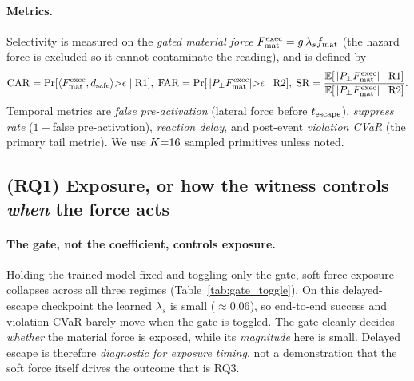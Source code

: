 \paragraph{Metrics.} Selectivity is measured on the \emph{gated material force} $F_{\rm mat}^{\rm exec}=g\,\lambda_s f_{\rm mat}$ (the hazard force is excluded so it cannot contaminate the reading), and is defined by
\begin{equation}
\mathrm{CAR}=\Pr[\langle F_{\rm mat}^{\rm exec},d_{\rm safe}\rangle{>}\epsilon\mid \mathrm{R1}],\;
\mathrm{FAR}=\Pr[\,|P_\perp F_{\rm mat}^{\rm exec}|{>}\epsilon\mid \mathrm{R2}],\;
\mathrm{SR}=\frac{\mathbb E[\,|P_\perp F_{\rm mat}^{\rm exec}|\mid \mathrm{R1}]}
                 {\mathbb E[\,|P_\perp F_{\rm mat}^{\rm exec}|\mid \mathrm{R2}]}.
\end{equation}
Temporal metrics are \emph{false pre-activation} (lateral force before $t_{\rm escape}$), \emph{suppress rate} ($1-$false pre-activation), \emph{reaction delay}, and post-event \emph{violation CVaR} (the primary tail metric). We use $K{=}16$ sampled primitives unless noted.

\subsection{(RQ1) Exposure, or how the witness controls \emph{when} the force acts}
\label{sec:exp_primary_delayed}

\paragraph{The gate, not the coefficient, controls exposure.}
Holding the trained model fixed and toggling only the gate, soft-force exposure collapses across all three regimes (Table~\ref{tab:gate_toggle}). On this delayed-escape checkpoint the learned $\lambda_s$ is small ($\approx0.06$), so end-to-end success and violation CVaR barely move when the gate is toggled. The gate cleanly decides \emph{whether} the material force is exposed, while its \emph{magnitude} here is small. Delayed escape is therefore \emph{diagnostic for exposure timing}, not a demonstration that the soft force itself drives the outcome that is RQ3.

